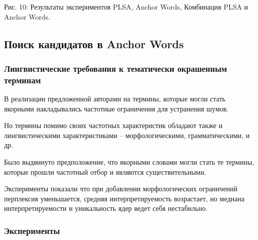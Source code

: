 \documentclass[a4paper, 14pt]{extarticle}
\begin{document}
Рис. 10: Результаты экспериментов PLSA, Anchor Words, Комбинация PLSA и Anchor Words.



\subsection{Поиск кандидатов в Anchor Words}
\subsubsection*{Лингвистические требования к тематически окрашенным терминам}
В реализации предложенной авторами на термины, которые могли стать якорными накладывались частотные ограничения для устранения шумов.

Но термины помимо своих частотных характеристик обладают также и лингвистическими характеристиками -- морфологическими, грамматическими, и  др.

Было выдвинуто предположение, что якорными словами могли стать те термины, которые прошли частотный отбор и являются существительными.

Эксперименты показали что при добавлении морфологических ограничений перплексия уменьшается, средняя интерпретируемость возрастает,  но медиана интерпретируемости и уникальность ядер ведет себя нестабильно.
\subsubsection*{Эксперименты}
\end{document}
